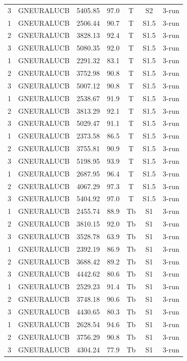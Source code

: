 \documentclass[11pt]{article}
\begin{document}
\begin{center}
\begin{longtable}{|c|c|c|c|c|c|c|}
3 & GNEURALUCB & 5405.85 & 97.0 & T & S2 & 3-run \\
1 & GNEURALUCB & 2506.44 & 90.7 & T & S1.5 & 3-run \\
2 & GNEURALUCB & 3828.13 & 92.4 & T & S1.5 & 3-run \\
3 & GNEURALUCB & 5080.35 & 92.0 & T & S1.5 & 3-run \\
1 & GNEURALUCB & 2291.32 & 83.1 & T & S1.5 & 3-run \\
2 & GNEURALUCB & 3752.98 & 90.8 & T & S1.5 & 3-run \\
3 & GNEURALUCB & 5007.12 & 90.8 & T & S1.5 & 3-run \\
1 & GNEURALUCB & 2538.67 & 91.9 & T & S1.5 & 3-run \\
2 & GNEURALUCB & 3813.29 & 92.1 & T & S1.5 & 3-run \\
3 & GNEURALUCB & 5029.47 & 91.1 & T & S1.5 & 3-run \\
1 & GNEURALUCB & 2373.58 & 86.5 & T & S1.5 & 3-run \\
2 & GNEURALUCB & 3755.81 & 90.9 & T & S1.5 & 3-run \\
3 & GNEURALUCB & 5198.95 & 93.9 & T & S1.5 & 3-run \\
1 & GNEURALUCB & 2687.95 & 96.4 & T & S1.5 & 3-run \\
2 & GNEURALUCB & 4067.29 & 97.3 & T & S1.5 & 3-run \\
3 & GNEURALUCB & 5404.92 & 97.0 & T & S1.5 & 3-run \\
1 & GNEURALUCB & 2455.74 & 88.9 & Tb & S1 & 3-run \\
2 & GNEURALUCB & 3810.15 & 92.0 & Tb & S1 & 3-run \\
3 & GNEURALUCB & 3528.78 & 63.9 & Tb & S1 & 3-run \\
1 & GNEURALUCB & 2392.19 & 86.9 & Tb & S1 & 3-run \\
2 & GNEURALUCB & 3688.42 & 89.2 & Tb & S1 & 3-run \\
3 & GNEURALUCB & 4442.62 & 80.6 & Tb & S1 & 3-run \\
1 & GNEURALUCB & 2529.23 & 91.4 & Tb & S1 & 3-run \\
2 & GNEURALUCB & 3748.18 & 90.6 & Tb & S1 & 3-run \\
3 & GNEURALUCB & 4430.65 & 80.3 & Tb & S1 & 3-run \\
1 & GNEURALUCB & 2628.54 & 94.6 & Tb & S1 & 3-run \\
2 & GNEURALUCB & 3756.29 & 90.8 & Tb & S1 & 3-run \\
3 & GNEURALUCB & 4304.24 & 77.9 & Tb & S1 & 3-run \\

\end{longtable}
\end{center}
\end{document}
